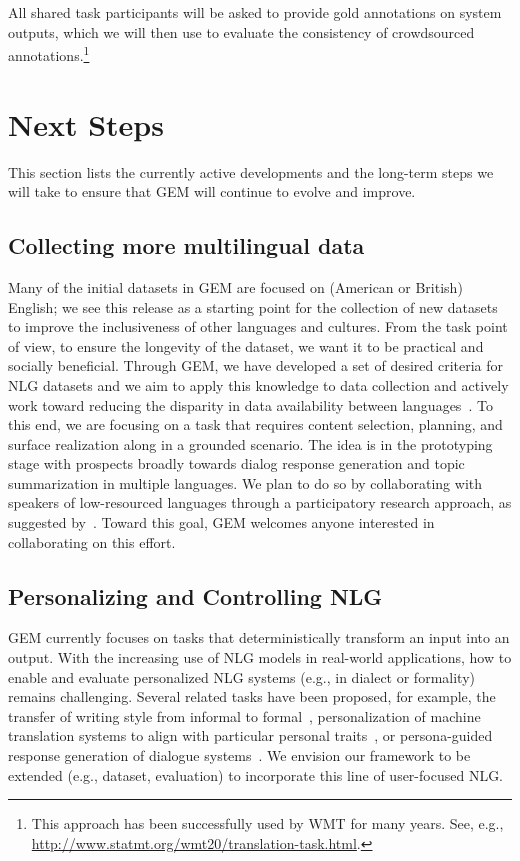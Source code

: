 \documentclass[11pt,a4paper]{article}
\newcommand{\GEM}{\textsc{GEM}}
\begin{document}
All shared task participants will be asked to provide gold annotations on system outputs, which we will then use to evaluate the consistency of crowdsourced annotations.\footnote{This approach has been successfully used by WMT for many years. See, e.g., \url{http://www.statmt.org/wmt20/translation-task.html}.}

\section{Next Steps}

This section lists the currently active developments and the long-term steps we will take to ensure that \GEM{} will continue to evolve and improve. 


\subsection{Collecting more multilingual data}

Many of the initial datasets in \GEM{} are focused on (American or British) English; we see this release as a starting point for the collection of new datasets to improve the inclusiveness of other languages and cultures. From the task point of view, to ensure the longevity of the dataset, we want it to be practical and socially beneficial. Through \GEM{}, we have developed a set of desired criteria for NLG datasets and we aim to apply this knowledge to data collection and actively work toward reducing the disparity in data availability between languages~\citep{joshi2020state}. To this end, we are focusing on a task that requires content selection, planning, and surface realization along in a grounded scenario. The idea is in the prototyping stage with prospects broadly towards dialog response generation and topic summarization in multiple languages. We plan to do so by collaborating with speakers of low-resourced languages through a participatory research approach, as suggested by~\citep{nekoto2020participatory}. Toward this goal, \GEM{} welcomes anyone interested in collaborating on this effort.



\subsection{Personalizing and Controlling NLG}
\GEM{} currently focuses on tasks that deterministically transform an input into an output. With the increasing use of NLG models in real-world applications, how to enable and evaluate personalized NLG systems (e.g., in dialect or formality) remains challenging. Several related tasks have been proposed, for example, the transfer of writing style from informal to formal~\citep{rao2018dear}, personalization of machine translation systems to align with particular personal traits~\citep{mirkin2015personalized}, or  persona-guided response generation of dialogue systems~\citep{zhang2018personalizing}. We envision our framework to be extended (e.g., dataset, evaluation) to incorporate this line of user-focused NLG.
\end{document}

